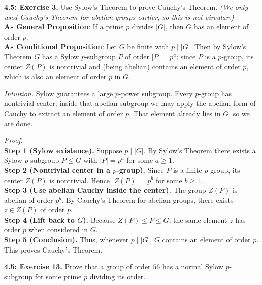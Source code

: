 \documentclass[11pt]{article}
\theoremstyle{definition}
\begin{document}
\newpage

\noindent \textbf{4.5: Exercise 3.} Use Sylow’s Theorem to prove Cauchy’s Theorem. \emph{(We only used Cauchy’s Theorem for abelian groups earlier, so this is not circular.)}\\ %

\noindent\textbf{As General Proposition}: If a prime $p$ divides $|G|$, then $G$ has an element of order $p$.\\

\noindent\textbf{As Conditional Proposition}: Let $G$ be finite with $p\mid |G|$. Then by Sylow’s Theorem $G$ has a Sylow $p$-subgroup $P$ of order $|P|=p^a$; since $P$ is a $p$-group, its center $Z(P)$ is nontrivial and (being abelian) contains an element of order $p$, which is also an element of order $p$ in $G$.

\newpage

\dotfill

\emph{Intuition.} Sylow guarantees a large $p$-power subgroup. Every $p$-group has nontrivial center; inside that abelian subgroup we may apply the abelian form of Cauchy to extract an element of order $p$. That element already lies in $G$, so we are done.\\

\dotfill

\emph{Proof.}\\
\textbf{Step 1 (Sylow existence).} Suppose $p\mid |G|$. By Sylow’s Theorem there exists a Sylow $p$-subgroup $P\le G$ with $|P|=p^a$ for some $a\ge 1$.\\
\textbf{Step 2 (Nontrivial center in a $p$-group).} Since $P$ is a finite $p$-group, its center $Z(P)$ is nontrivial. Hence $|Z(P)|=p^b$ for some $b\ge 1$.\\
\textbf{Step 3 (Use abelian Cauchy inside the center).} The group $Z(P)$ is abelian of order $p^b$. By Cauchy’s Theorem for abelian groups, there exists $z\in Z(P)$ of order $p$.\\
\textbf{Step 4 (Lift back to $G$).} Because $Z(P)\le P\le G$, the same element $z$ has order $p$ when considered in $G$.\\
\textbf{Step 5 (Conclusion).} Thus, whenever $p\mid |G|$, $G$ contains an element of order $p$. This proves Cauchy’s Theorem.\\

\newpage

\newpage

\noindent \textbf{4.5: Exercise 13.} Prove that a group of order $56$ has a normal Sylow $p$-subgroup for some prime $p$ dividing its order.\\ %
\end{document}
